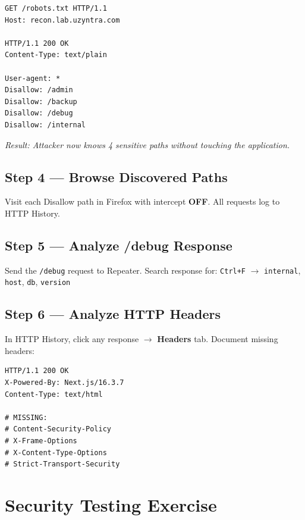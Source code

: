 \begin{lstlisting}[style=http, caption={robots.txt request — CWE-538}]
GET /robots.txt HTTP/1.1
Host: recon.lab.uzyntra.com

HTTP/1.1 200 OK
Content-Type: text/plain

User-agent: *
Disallow: /admin
Disallow: /backup
Disallow: /debug
Disallow: /internal
\end{lstlisting}

\textit{Result: Attacker now knows 4 sensitive paths without touching the application.}

\subsection{Step 4 — Browse Discovered Paths}
Visit each Disallow path in Firefox with intercept \textbf{OFF}. All requests log to HTTP History.

\subsection{Step 5 — Analyze /debug Response}
Send the \texttt{/debug} request to Repeater. Search response for:
\texttt{Ctrl+F} $\to$ \texttt{internal}, \texttt{host}, \texttt{db}, \texttt{version}

\subsection{Step 6 — Analyze HTTP Headers}
In HTTP History, click any response $\to$ \textbf{Headers} tab. Document missing headers:

\begin{lstlisting}[style=http, caption={Missing security headers — CWE-693}]
HTTP/1.1 200 OK
X-Powered-By: Next.js/16.3.7
Content-Type: text/html

# MISSING:
# Content-Security-Policy
# X-Frame-Options
# X-Content-Type-Options
# Strict-Transport-Security
\end{lstlisting}

\section{Security Testing Exercise}

